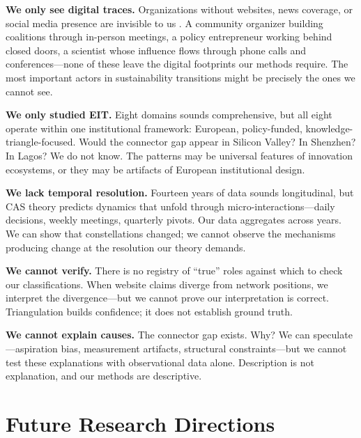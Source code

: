 \documentclass[../main.tex]{subfiles}
\begin{document}
\textbf{We only see digital traces.} Organizations without websites, news coverage, or social media presence are invisible to us \cite{boyd2012critical,tufekci2014big}. A community organizer building coalitions through in-person meetings, a policy entrepreneur working behind closed doors, a scientist whose influence flows through phone calls and conferences---none of these leave the digital footprints our methods require. The most important actors in sustainability transitions might be precisely the ones we cannot see.

\textbf{We only studied EIT.} Eight domains sounds comprehensive, but all eight operate within one institutional framework: European, policy-funded, knowledge-triangle-focused. Would the connector gap appear in Silicon Valley? In Shenzhen? In Lagos? We do not know. The patterns may be universal features of innovation ecosystems, or they may be artifacts of European institutional design.

\textbf{We lack temporal resolution.} Fourteen years of data sounds longitudinal, but CAS theory predicts dynamics that unfold through micro-interactions---daily decisions, weekly meetings, quarterly pivots. Our data aggregates across years. We can show that constellations changed; we cannot observe the mechanisms producing change at the resolution our theory demands.

\textbf{We cannot verify.} There is no registry of ``true'' roles against which to check our classifications. When website claims diverge from network positions, we interpret the divergence---but we cannot prove our interpretation is correct. Triangulation builds confidence; it does not establish ground truth.

\textbf{We cannot explain causes.} The connector gap exists. Why? We can speculate---aspiration bias, measurement artifacts, structural constraints---but we cannot test these explanations with observational data alone. Description is not explanation, and our methods are descriptive.


\section{Future Research Directions}
\end{document}

